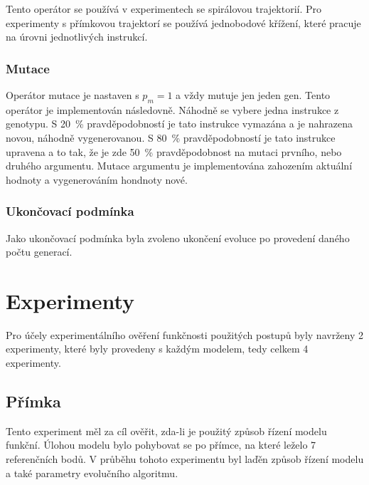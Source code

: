 Tento operátor se používá v experimentech se spirálovou trajektorií.
Pro experimenty s přímkovou trajektorí se používá jednobodové křížení, které pracuje na úrovni jednotlivých instrukcí.

\subsection{Mutace}
Operátor mutace je nastaven s $p_m = 1$ a vždy mutuje jen jeden gen.
Tento operátor je implementován následovně.
Náhodně se vybere jedna instrukce z genotypu.
S 20~\% pravděpodobností je tato instrukce vymazána a je nahrazena novou, náhodně vygenerovanou.
S 80~\% pravděpodobností je tato instrukce upravena a to tak, že je zde 50~\% pravděpodobnost na mutaci prvního, nebo druhého argumentu.
Mutace argumentu je implementována zahozením aktuální hodnoty a vygenerováním hondnoty nové.


\subsection{Ukončovací podmínka}
Jako ukončovací podmínka byla zvoleno ukončení evoluce po provedení daného počtu generací.




\chapter{Experimenty}
Pro účely experimentálního ověření funkčnosti použitých postupů byly navrženy 2 experimenty, které byly provedeny s každým modelem, tedy celkem 4 experimenty.

\section{Přímka}
Tento experiment měl za cíl ověřit, zda-li je použitý způsob řízení modelu funkční.
Úlohou modelu bylo pohybovat se po přímce, na které leželo 7 referenčních bodů.
V průběhu tohoto experimentu byl laďěn způsob řízení modelu a také parametry evolučního algoritmu.

